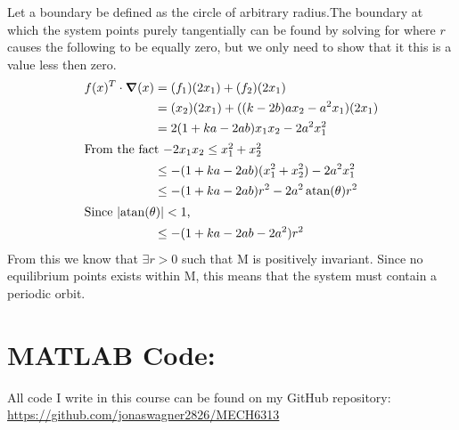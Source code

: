 \documentclass[letter]{article}
\begin{document}
Let a boundary be defined as the circle of arbitrary radius.The boundary at which the system points purely tangentially can be found by solving for where $r$ causes the following to be equally zero, but we only need to show that it this is a value less then zero.
\begin{align}
	f(x)^T \cdot \grad(x) &= (f_1)(2 x_1) + (f_2)(2x_1)\\
	&= (x_2)(2 x_1) + ((k-2b)ax_2 - a^2 x_1)(2 x_1)\\
	&= 2(1 + ka - 2ab) x_1 x_2 - 2a^2 x_1^2\\
	\intertext{From the fact $-2 x_1 x_2 \leq x_1^2 + x_2^2$}
	&\leq -(1 + ka - 2ab) (x_1^2 + x_2^2) -2 a^2 x_1^2\\
	&\leq -(1 + ka - 2ab) r^2 - 2 a^2 \atan(\theta) r^2\\
	\intertext{Since $\abs{\atan(\theta)} < 1$,}
	&\leq -(1 + ka - 2ab - 2a^2)r^2
\end{align}
From this we know that $\exists r > 0$ such that M is positively invariant. Since no equilibrium points exists within M, this means that the system must contain a periodic orbit.






\newpage
\appendix
\section{MATLAB Code:}
All code I write in this course can be found on my GitHub repository:\\
\href{https://github.com/jonaswagner2826/MECH6313}{https://github.com/jonaswagner2826/MECH6313}

\end{document}
